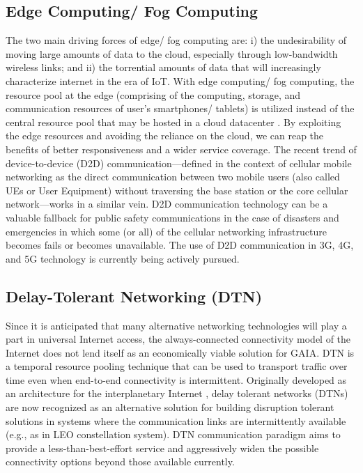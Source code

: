\documentclass{sigcomm-alternate}
\begin{document}
\subsection{Edge Computing/ Fog Computing}

The two main driving forces of edge/ fog computing are: i) the undesirability of moving large amounts of data to the cloud, especially through low-bandwidth wireless links; and ii) the torrential amounts of data that will increasingly characterize internet in the era of IoT. With edge computing/ fog computing, the resource pool at the edge (comprising of the computing, storage, and communication resources of user's smartphones/ tablets) is utilized instead of the central resource pool that may be hosted in a cloud datacenter \cite{bonomi2012fog}. By exploiting the edge resources and avoiding the reliance on the cloud, we can reap the benefits of better responsiveness and a wider service coverage. The recent trend of device-to-device (D2D) communication---defined in the context of cellular mobile networking as the direct communication between two mobile users (also called UEs or User Equipment) without traversing the base station or the core cellular network---works in a similar vein. D2D communication technology can be a valuable fallback for public safety communications in the case of disasters and emergencies in which some  (or all) of the cellular networking infrastructure becomes fails or becomes unavailable. The use of D2D communication in 3G, 4G, and 5G technology is currently being actively pursued.  







\subsection{Delay-Tolerant Networking (DTN)}

Since it is anticipated that many alternative networking technologies will play a part in universal Internet access, the always-connected connectivity model of the Internet does not lend itself as an economically viable solution for GAIA. DTN is a temporal resource pooling technique that can be used to transport traffic over time even when end-to-end connectivity is intermittent. Originally developed as an architecture for the interplanetary Internet \cite{burleigh2003delay}, delay tolerant networks (DTNs) are now recognized as an alternative solution for building disruption tolerant solutions in systems where the communication links are intermittently available (e.g., as in LEO constellation system). DTN communication paradigm aims to provide a less-than-best-effort service and aggressively widen the possible connectivity options beyond those available currently.  
\end{document}
